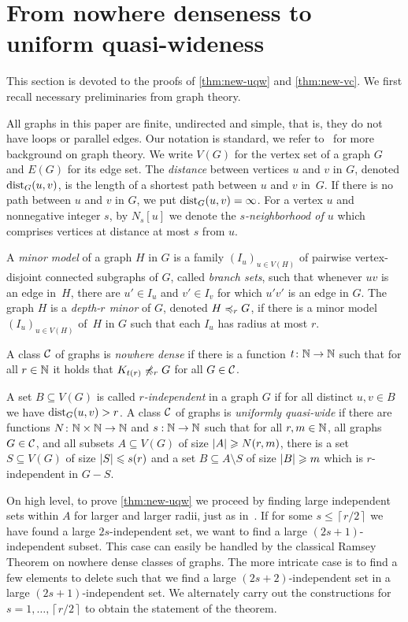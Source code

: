 \section{From nowhere denseness to uniform quasi-wideness}\label{sec:uqw}

This section is devoted to the proofs of \cref{thm:new-uqw} and \cref{thm:new-vc}. 
We first recall necessary preliminaries from graph theory. 

All graphs in this paper are finite, undirected and simple, that is, 
they do not have loops or parallel edges. Our notation is standard,
we refer to~\cite{diestel2012graph} for more background on 
graph theory. 
We write $V(G)$ for the vertex set of a graph $G$ and
$E(G)$ for its edge set. 
The {\em{distance}} between vertices $u$ and $v$ in $G$, denoted $\mathrm{dist}_G(u,v)$, is the length of a shortest path between $u$ and $v$ in~$G$.
If there is no path between $u$ and $v$ in $G$, we put $\mathrm{dist}_G(u,v)=\infty$.
For a vertex $u$ and nonnegative integer $s$, by $N_s[u]$ we denote the {\em{$s$-neighborhood of $u$}} which comprises vertices at distance at most $s$ from $u$.

A {\em{minor model}} of a graph $H$ in $G$ is a family $(I_u)_{u\in V(H)}$ of pairwise vertex-disjoint connected subgraphs of $G$, called {\em{branch sets}},
such that whenever $uv$ is an edge in~$H$, there are $u'\in I_u$ and $v'\in I_v$ for which $u'v'$ 
is an edge in $G$.
The graph $H$ is a {\em{depth-$r$ minor}} of $G$, denoted $H\preccurlyeq_rG$, if there is a minor model
$(I_u)_{u\in V(H)}$ of~$H$ in $G$ such that each $I_u$ has radius at most $r$.

A class $\mathcal{C}$ of graphs is \emph{nowhere dense} if there is a function 
$t\colon \mathbb{N}\rightarrow \mathbb{N}$ such that for all $r\in \mathbb{N}$ it holds that $K_{t(r)}\not\preccurlyeq_r G$
for all $G\in \mathcal{C}$. 

A set $B\subseteq V(G)$ is called {\em{$r$-independent}} in a graph $G$ if for all
distinct $u,v\in B$ we have $\mathrm{dist}_G(u,v)>r$.
A class $\mathcal{C}$ of graphs is \emph{uniformly quasi-wide} if there are
functions $N\colon \mathbb{N}\times\mathbb{N}\rightarrow \mathbb{N}$ and $s:\mathbb{N}\rightarrow \mathbb{N}$ such
that for all $r,m\in \mathbb{N}$, all graphs $G\in \mathcal{C}$, and all subsets $A\subseteq V(G)$ of size $\left\lvert A\right\rvert\geqslant N(r,m)$, there is a set
$S\subseteq V(G)$ of size $\left\lvert S\right\rvert\leqslant s(r)$ and a set
$B\subseteq A\setminus S$ of size $\left\lvert B\right\rvert\geqslant m$ which is $r$-independent in
$G-S$. 

On high level, to prove \cref{thm:new-uqw} we proceed by finding large independent sets within $A$ for larger and larger radii, just as in~\cite{nevsetvril2010first}.
If for some $s\leq \left\lceil r/2\right\rceil$
we have found a large $2s$-independent set, we want to find a large 
$(2s+1)$-independent subset. This case can easily be handled by the classical Ramsey 
Theorem on nowhere dense classes of graphs. The more
intricate case is to find a few elements to delete such that
we find a large $(2s+2)$-independent set in a large $(2s+1)$-independent set. 
We alternately carry out the constructions for $s=1,\ldots, \left\lceil r/2\right\rceil$ to 
obtain the statement of the theorem. 

